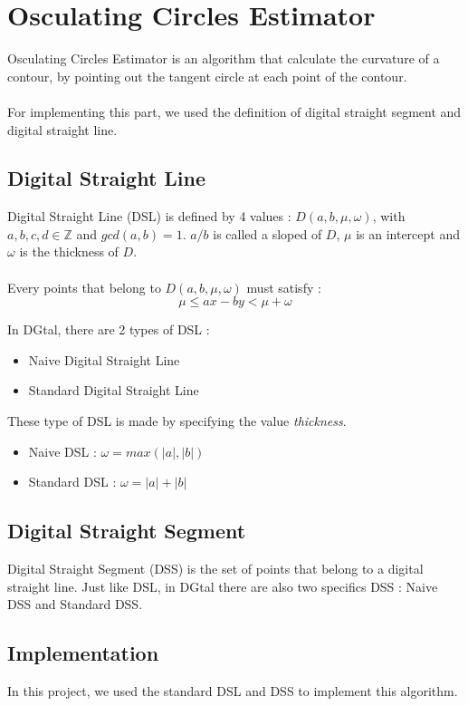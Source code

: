 \section{Osculating Circles Estimator}

Osculating Circles Estimator is an algorithm that calculate the curvature of a contour, by pointing out the tangent circle at each point of the contour. 

\paragraph{}
For implementing this part, we used the definition of digital straight segment and digital straight line. 

\subsection{Digital Straight Line}
Digital Straight Line (DSL) is defined by 4 values : $D(a, b, \mu, \omega)$, with $a, b, c, d \in \mathbb{Z}$ and $gcd(a, b) = 1$. $a/b$ is called a sloped of $D$, $\mu$ is an intercept and $\omega$ is the thickness of $D$.

\paragraph{}
Every points that belong to $D(a, b, \mu, \omega)$ must satisfy :
$$
\mu \leq ax-by < \mu + \omega
$$

In DGtal, there are 2 types of DSL :
\begin{itemize}
\item Naive Digital Straight Line
\item Standard Digital Straight Line
\end{itemize}

These type of DSL is made by specifying the value \textit{thickness}. 

\begin{itemize}
\item Naive DSL : $\omega = max(|a|, |b|)$
\item Standard DSL : $\omega = |a| + |b|$
\end{itemize}

\subsection{Digital Straight Segment}
Digital Straight Segment (DSS) is the set of points that belong to a digital straight line. Just like DSL, in DGtal there are also two specifics DSS : Naive DSS and Standard DSS.

\subsection{Implementation}
In this project, we used the standard DSL and DSS to implement this algorithm. 